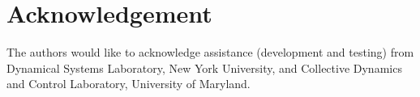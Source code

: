 \documentclass[11pt]{article}
\begin{document}
\begin{enumerate}
\end{enumerate}


\section{Acknowledgement}
The authors would like to acknowledge assistance (development and testing) from Dynamical Systems Laboratory, New York University, and Collective Dynamics and Control Laboratory, University of Maryland.



\end{document}
